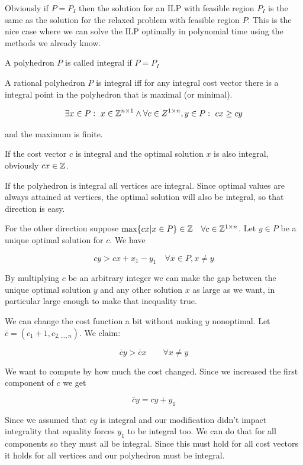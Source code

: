 Obviously if $P=P_I$ then the solution for an ILP with feasible region $P_I$ is the same as the solution for the relaxed problem with feasible region $P$. This is the nice case where we can solve the ILP optimally in polynomial time using the methods we already know.

\begin{Def} A polyhedron $P$ is called integral if $P=P_I$\end{Def}

\begin{thm}\label{Thm:polyIntegrality} A rational polyhedron $P$ is integral iff for any integral cost vector there is a integral point in the polyhedron that is maximal (or minimal).

\[\exists x\in P:\ x\in \mathbb{Z}^{n\times 1} \wedge \forall c\in Z^{1\times n}, y \in P:\ cx\geq cy\]

and the maximum is finite. 
\end{thm}

If the cost vector $c$ is integral and the optimal solution $x$ is also integral, obviously $cx\in \mathbb{Z}$.

\begin{pr} If the polyhedron is integral all vertices are integral. Since optimal values are always attained at vertices, the optimal solution will also be integral, so that direction is easy.

For the other direction suppose $\max \{cx | x\in P\}\in \mathbb{Z}\quad \forall c\in \mathbb{Z}^{1\times n}$. Let $y\in P$ be a unique optimal solution for $c$. We have 

\[cy>cx + x_1 -y_1 \quad \forall x\in P,x\neq y\]

By multiplying $c$ be an arbitrary integer we can make the gap between the unique optimal solution $y$ and any other solution $x$ as large as we want, in particular large enough to make that inequality true.

We can change the cost function a bit without making $y$ nonoptimal. Let $\bar c = (c_1+1,c_{2,\ldots,n})$. We claim:

\[\bar c y > \bar c x\qquad \forall x\neq y\]

We want to compute by how much the cost changed. Since we increased the first component of $c$ we get

\[\bar c y = cy+y_1\]

Since we assumed that $cy$ is integral and our modification didn't impact integrality that equality forces $y_1$ to be integral too. We can do that for all components so they must all be integral. Since this must hold for all cost vectors it holds for all vertices and our polyhedron must be integral.
\end{pr}


